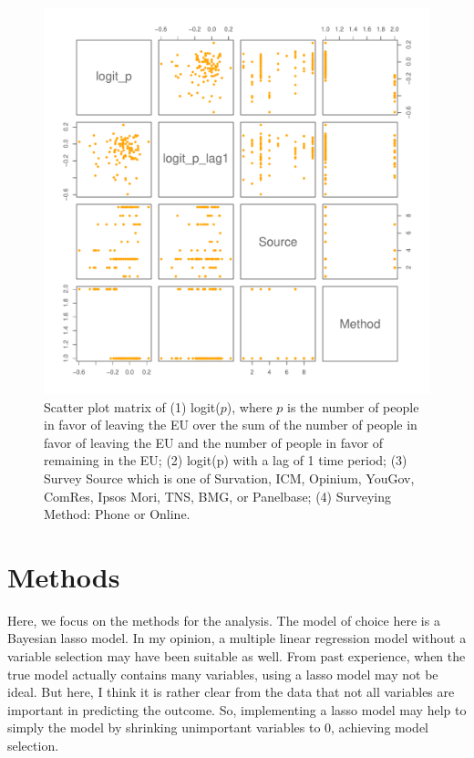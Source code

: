 \documentclass{../../tex_template/asaproc}
\begin{document}
\begin{figure}[H]
  \includegraphics[scale=.5]{figs/pairs.pdf}
  \caption{\small Scatter plot matrix of (1) logit($p$), where $p$ is the
    number of people in favor of leaving the EU over the sum of the number of
    people in favor of leaving the EU and the number of people in favor of
    remaining in the EU; (2) logit(p) with a lag of 1 time period; (3) Survey
    Source which is one of Survation, ICM, Opinium, YouGov, ComRes, Ipsos Mori,
    TNS, BMG, or Panelbase; (4) Surveying Method: Phone or Online.}
  \label{fig:pairs}
\end{figure}

\section{Methods}
Here, we focus on the methods for the analysis. The model of choice here is a
Bayesian lasso model. In my opinion, a multiple linear regression model without
a variable selection may have been suitable as well. From past experience, when
the true model actually contains many variables, using a lasso model may not be
ideal. But here, I think it is rather clear from the data that not all
variables are important in predicting the outcome. So, implementing a lasso
model may help to simply the model by shrinking unimportant variables to 0,
achieving model selection. \\
\end{document}
